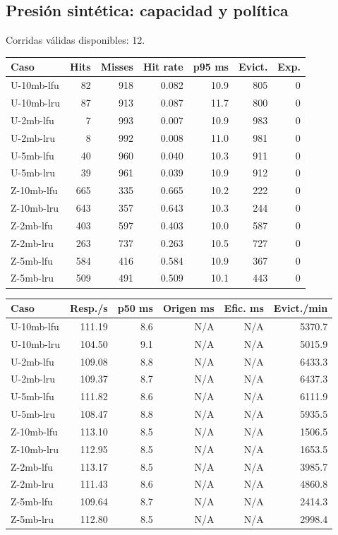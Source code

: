\documentclass[11pt]{article}
\begin{document}
\subsection{Presión sintética: capacidad y política}
Corridas válidas disponibles: 12.\par
{\small\begin{longtable}{lrrrrrr}\toprule Caso & Hits & Misses & Hit rate & p95 ms & Evict. & Exp.\\\midrule\endhead
U-10mb-lfu & 82 & 918 & 0.082 & 10.9 & 805 & 0 \\
U-10mb-lru & 87 & 913 & 0.087 & 11.7 & 800 & 0 \\
U-2mb-lfu & 7 & 993 & 0.007 & 10.9 & 983 & 0 \\
U-2mb-lru & 8 & 992 & 0.008 & 11.0 & 981 & 0 \\
U-5mb-lfu & 40 & 960 & 0.040 & 10.3 & 911 & 0 \\
U-5mb-lru & 39 & 961 & 0.039 & 10.9 & 912 & 0 \\
Z-10mb-lfu & 665 & 335 & 0.665 & 10.2 & 222 & 0 \\
Z-10mb-lru & 643 & 357 & 0.643 & 10.3 & 244 & 0 \\
Z-2mb-lfu & 403 & 597 & 0.403 & 10.0 & 587 & 0 \\
Z-2mb-lru & 263 & 737 & 0.263 & 10.5 & 727 & 0 \\
Z-5mb-lfu & 584 & 416 & 0.584 & 10.9 & 367 & 0 \\
Z-5mb-lru & 509 & 491 & 0.509 & 10.1 & 443 & 0 \\
\bottomrule\end{longtable}}
{\small\begin{longtable}{lrrrrr}\toprule Caso & Resp./s & p50 ms & Origen ms & Efic. ms & Evict./min\\\midrule\endhead
U-10mb-lfu & 111.19 & 8.6 & N/A & N/A & 5370.7 \\
U-10mb-lru & 104.50 & 9.1 & N/A & N/A & 5015.9 \\
U-2mb-lfu & 109.08 & 8.8 & N/A & N/A & 6433.3 \\
U-2mb-lru & 109.37 & 8.7 & N/A & N/A & 6437.3 \\
U-5mb-lfu & 111.82 & 8.6 & N/A & N/A & 6111.9 \\
U-5mb-lru & 108.47 & 8.8 & N/A & N/A & 5935.5 \\
Z-10mb-lfu & 113.10 & 8.5 & N/A & N/A & 1506.5 \\
Z-10mb-lru & 112.95 & 8.5 & N/A & N/A & 1653.5 \\
Z-2mb-lfu & 113.17 & 8.5 & N/A & N/A & 3985.7 \\
Z-2mb-lru & 111.43 & 8.6 & N/A & N/A & 4860.8 \\
Z-5mb-lfu & 109.64 & 8.7 & N/A & N/A & 2414.3 \\
Z-5mb-lru & 112.80 & 8.5 & N/A & N/A & 2998.4 \\
\bottomrule\end{longtable}}
\end{document}
